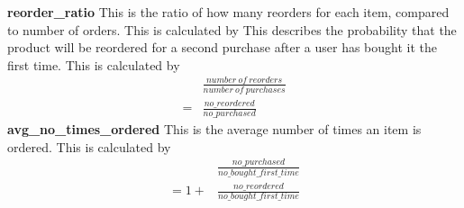 \documentclass[12pt]{article}
\begin{document}
\newline\newline
{\textbf{reorder\_ratio}}
\newline
This is the ratio of how many reorders for each item, compared to number of orders. This is calculated by 
This describes the probability that the product will be reordered for a second purchase after a user has bought it the first time. This is calculated by
\begin{equation}
    \begin{split}
        &\frac
        {number\ of\ reorders}
        {number\ of\ purchases}\\
        = &\frac
        {no\_reordered}
        {no\_purchased}
    \end{split}
\end{equation}
\newline\newline
{\textbf{avg\_no\_times\_ordered}}
\newline
This is the average number of times an item is ordered. This is calculated by 
\begin{equation}
    \begin{split}
        &\frac
        {no\_purchased}
        {no\_bought\_first\_time}\\
        =1 + &\frac
        {no\_reordered}
        {no\_bought\_first\_time}
    \end{split}
\end{equation}
\end{document}
